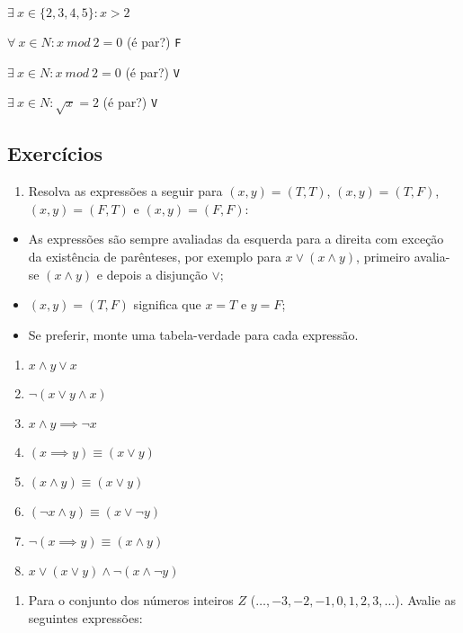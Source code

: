 \(\exists\ x \in \{2, 3, 4, 5\} : x > 2\)

    \(\forall\ x \in N : x\ mod\ 2 = 0\) (é par?) \texttt{F}

\(\exists\ x \in N : x\ mod\ 2 = 0\) (é par?) \texttt{V}

\(\exists\ x \in N : \sqrt{x} = 2\) (é par?) \texttt{V}

\subsection*{Exercícios}

\begin{enumerate}
\def\labelenumi{\arabic{enumi}.}
\item
  Resolva as expressões a seguir para \((x,y)=(T,T)\), \((x,y)=(T,F)\),
  \((x,y)=(F,T)\) e \((x,y)=(F,F)\):
\end{enumerate}

\begin{itemize}
\item
  As expressões são sempre avaliadas da esquerda para a direita com
  exceção da existência de parênteses, por exemplo para
  \(x \lor (x \land y)\), primeiro avalia-se \((x \land y)\) e depois a
  disjunção \(\lor\);
\item
  \((x,y)=(T,F)\) significa que \(x=T\) e \(y=F\);
\item
  Se preferir, monte uma tabela-verdade para cada expressão.
\end{itemize}

\begin{enumerate}
\def\labelenumi{\alph{enumi}.}
\item
  \(x\land y \lor x\)
\item
  \(\neg (x\lor y \land x)\)
\item
  \(x \land y \implies \neg x\)
\item
  \((x \implies y) \equiv (x \lor y)\)
\item
  \((x \land y) \equiv (x \lor y)\)
\item
  \((\neg x \land y) \equiv (x \lor \neg y)\)
\item
  \(\neg(x \implies y) \equiv (x \land y)\)
\item
  \(x \lor (x \lor y) \land \neg(x \land \neg y)\)
\end{enumerate}

\begin{enumerate}
\def\labelenumi{\arabic{enumi}.}
\setcounter{enumi}{1}
\item
  Para o conjunto dos números inteiros \(Z\)
  (\(\ldots, -3, -2, -1, 0, 1, 2, 3, \ldots\)). Avalie as seguintes
  expressões:
\end{enumerate}

